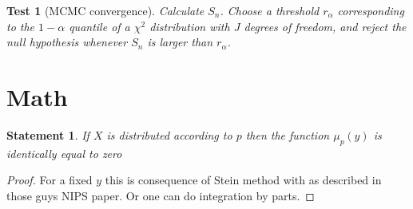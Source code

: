 \documentclass{article}
\newtheorem{statement}{Statement}
\newtheorem{test}{Test}
\begin{document}
\begin{test}[MCMC convergence]
\label{test}
Calculate $S_n$. Choose a threshold $r_\alpha$ corresponding to the $1-\alpha$ quantile of a  $\chi^2$ distribution with $J$ degrees of freedom, and reject the null hypothesis whenever $S_n$ is larger than $r_\alpha$. 
\end{test}


\section{Math}

\begin{statement}
 If $X$ is distributed according to $p$ then the function  $\mu_p(y)$ is identically equal to zero  
\end{statement}
\begin{proof}
 For a fixed $y$ this is consequence of Stein method with as described in those guys NIPS paper. Or one can do integration by parts.   
\end{proof}
\end{document}
